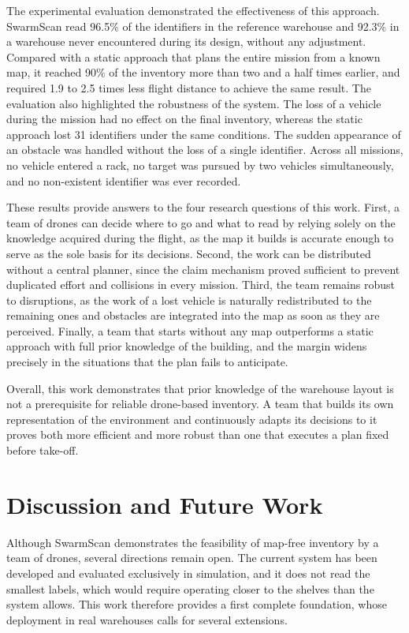 The experimental evaluation demonstrated the effectiveness of this approach.
SwarmScan read 96.5\% of the identifiers in the reference warehouse and 92.3\% in
a warehouse never encountered during its design, without any adjustment. Compared
with a static approach that plans the entire mission from a known map, it reached
90\% of the inventory more than two and a half times earlier, and required 1.9 to
2.5 times less flight distance to achieve the same result. The evaluation also
highlighted the robustness of the system. The loss of a vehicle during the
mission had no effect on the final inventory, whereas the static approach lost 31
identifiers under the same conditions. The sudden appearance of an obstacle was
handled without the loss of a single identifier. Across all missions, no vehicle
entered a rack, no target was pursued by two vehicles simultaneously, and no
non-existent identifier was ever recorded.

These results provide answers to the four research questions of this work. First,
a team of drones can decide where to go and what to read by relying solely on the
knowledge acquired during the flight, as the map it builds is accurate enough to
serve as the sole basis for its decisions. Second, the work can be distributed
without a central planner, since the claim mechanism proved sufficient to prevent
duplicated effort and collisions in every mission. Third, the team remains robust
to disruptions, as the work of a lost vehicle is naturally redistributed to the
remaining ones and obstacles are integrated into the map as soon as they are
perceived. Finally, a team that starts without any map outperforms a static
approach with full prior knowledge of the building, and the margin widens
precisely in the situations that the plan fails to anticipate.

Overall, this work demonstrates that prior knowledge of the warehouse layout is
not a prerequisite for reliable drone-based inventory. A team that builds its own
representation of the environment and continuously adapts its decisions to it
proves both more efficient and more robust than one that executes a plan fixed
before take-off.

\section*{Discussion and Future Work}

Although SwarmScan demonstrates the feasibility of map-free inventory by a team
of drones, several directions remain open. The current system has been developed
and evaluated exclusively in simulation, and it does not read the smallest
labels, which would require operating closer to the shelves than the system
allows. This work therefore provides a first complete foundation, whose
deployment in real warehouses calls for several extensions.

